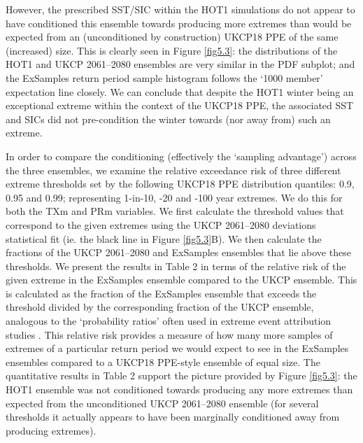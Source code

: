       However, the prescribed SST/SIC within the HOT1 simulations do not appear to have conditioned this ensemble towards producing more extremes than would be expected from an (unconditioned by construction) UKCP18 PPE of the same (increased) size. This is clearly seen in Figure \ref{fig5.3}: the distributions of the HOT1 and UKCP 2061--2080 ensembles are very similar in the PDF subplot; and the ExSamples return period sample histogram follows the `1000 member' expectation line closely. We can conclude that despite the HOT1 winter being an exceptional extreme within the context of the UKCP18 PPE, the associated SST and SICs did not pre-condition the winter towards (nor away from) such an extreme.
      
      In order to compare the conditioning (effectively the `sampling advantage') across the three ensembles, we examine the relative exceedance risk of three different extreme thresholds set by the following UKCP18 PPE distribution quantiles: 0.9, 0.95 and 0.99; representing 1-in-10, -20 and -100 year extremes. We do this for both the TXm and PRm variables. We first calculate the threshold values that correspond to the given extremes using the UKCP 2061--2080 deviations statistical fit (ie. the black line in Figure \ref{fig5.3}B). We then calculate the fractions of the UKCP 2061--2080 and ExSamples ensembles that lie above these thresholds. We present the results in Table 2 in terms of the relative risk of the given extreme in the ExSamples ensemble compared to the UKCP ensemble. This is calculated as the fraction of the ExSamples ensemble that exceeds the threshold divided by the corresponding fraction of the UKCP ensemble, analogous to the `probability ratios' often used in extreme event attribution studies \citep{stone_end--end_2005,stott_human_2004}. This relative risk provides a measure of how many more samples of extremes of a particular return period we would expect to see in the ExSamples ensembles compared to a UKCP18 PPE-style ensemble of equal size. The quantitative results in Table 2 support the picture provided by Figure \ref{fig5.3}: the HOT1 ensemble was not conditioned towards producing any more extremes than expected from the unconditioned UKCP 2061--2080 ensemble (for several thresholds it actually appears to have been marginally conditioned away from producing extremes).
      
